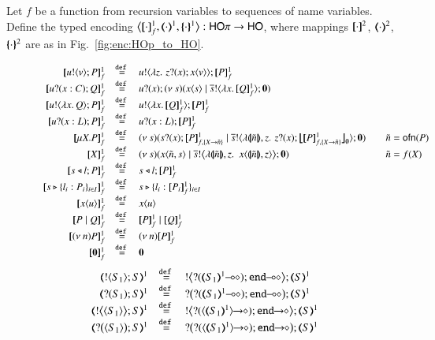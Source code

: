 \begin{definition}\rm
	\label{def:enc:HOp_to_HO}
	Let $f$ be a function from recursion variables to sequences of name variables.
	Define the typed encoding $\enco{\map{\cdot}^{1}_f, \mapt{\cdot}^{1}, \mapa{\cdot}^{1}}: \HOp \to \HO$,
	where mappings $[\!\![\cdot]\!\!]^{2}$, $(\!\!\langle\cdot\rangle\!\!)^{2}$, $\{\!\!\{\cdot\}\!\!\}^{2}$
	are as in Fig.~\ref{fig:enc:HOp_to_HO}.
\end{definition}

\begin{figure}[h!]
\[
	\begin{array}{rcll}
			\pmapp{\bout{u}{v} P}{1}{f}	&\defeq&	\bout{u}{ \abs{z}{\,\binp{z}{x} \appl{x}{v}} } \pmapp{P}{1}{f}
		\\
		\pmapp{\binp{u}{x: C} Q}{1}{f}	&\defeq&	\binp{u}{x} \newsp{s}{\appl{x}{s} \Par \bout{\dual{s}}{\abs{x}{\pmapp{Q}{1}{f}}} \inact}
		\\
				\pmapp{\bout{u}{\abs{x}{Q}} P}{1}{f} &\defeq& \bout{u}{\abs{x}{\pmapp{Q}{1}{f}}} \pmapp{P}{1}{f}
		\\
		\pmapp{\binp{u}{x: L} P}{1}{f}	&\defeq&	\binp{u}{x: L} \pmapp{P}{1}{f}
		\\
		\pmapp{\recp{X}{P}}{1}{f} &\defeq&
		\newsp{s}{\binp{s}{x} \pmapp{P}{1}{{f,\{\varp{X}\to \tilde{n}\}}} \Par
		\bout{\dual{s}}{\abs{\vmap{\tilde{n}}, z } \,{\binp{z}{x} \auxmap{\pmapp{P}{1}{{f,\{\varp{X}\to \tilde{n}\}}}}{\es}}} \inact} &
		\quad \tilde{n} = \ofn{P}
		\\
		\pmapp{\varp{X}}{1}{f} &\defeq& \newsp{s}{\appl{x}{\tilde{n}, s} \Par \bbout{\dual{s}}{ \abs{\vmap{\tilde{n}},z}\,\,{\appl{x}{ \vmap{\tilde{n}}, z}}} \inact} &
		\quad \tilde{n} = f(\varp{X})
		\\
		\pmapp{\bsel{s}{l} P}{1}{f}	&\defeq&	\bsel{s}{l} \pmapp{P}{1}{f}
		\\
		\pmapp{\bbra{s}{l_i: P_i}_{i \in I}}{1}{f} &\defeq& \bbra{s}{l_i: \pmapp{P_i}{1}{f}}_{i \in I}
		\\
		\pmapp{\appl{x}{u}}{1}{f}	&\defeq&	\appl{x}{u}
		\\
		\pmapp{P \Par Q}{1}{f}		&\defeq&	\pmapp{P}{1}{f} \Par \pmapp{Q}{1}{f}
		\\
		\pmapp{\news{n} P}{1}{f}	&\defeq&	\news{n} \pmapp{P}{1}{f}
		\\
		\pmapp{\inact}{1}{f}		&\defeq&	\inact
	\end{array}
\]
%
\[
	\begin{array}{c}
		\begin{array}{rcl}
			\tmap{\btout{S_1} S}{1}	&\defeq&	\bbtout{\lhot{\btinp{\lhot{\tmap{S_1}{1}}}\tinact}} \tmap{S}{1}
			\\
			\tmap{\btinp{S_1} S}{1}	&\defeq&	\bbtinp{\lhot{\btinp{\lhot{\tmap{S_1}{1}}}\tinact}} \tmap{S}{1}
			\\
			\tmap{\bbtout{\chtype{S_1}} S}{1}	&\defeq&	\bbtout{\shot{\btinp{\shot{\chtype{\tmap{S_1}{1}}}}\tinact}} \tmap{S}{1}
			\\
			\tmap{\bbtinp{\chtype{S_1}} S}{1}	&\defeq&	\bbtinp{\shot{\btinp{\shot{\chtype{\tmap{S_1}{1}}}}\tinact}} \tmap{S}{1}
			\\


\end{array}
\end{array}\]
\end{figure}
